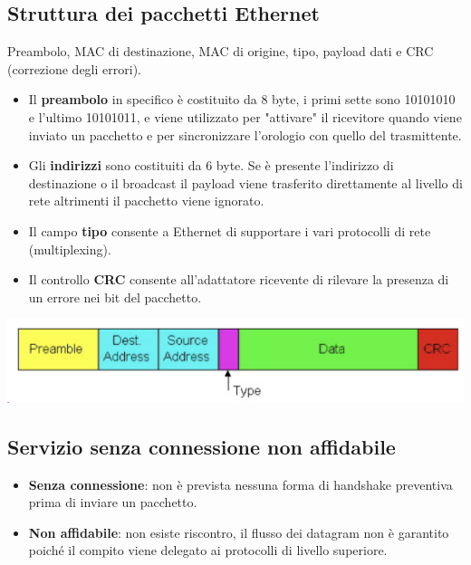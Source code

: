 \documentclass{report}
\begin{document}
\hypertarget{header-n149}{%
\subsection{Struttura dei pacchetti Ethernet}\label{header-n149}}

Preambolo, MAC di destinazione, MAC di origine, tipo, payload dati e CRC
(correzione degli errori).

\begin{itemize}
\item
  Il \textbf{preambolo} in specifico è costituito da 8 byte, i primi
  sette sono 10101010 e l'ultimo 10101011, e viene utilizzato per
  "attivare" il ricevitore quando viene inviato un pacchetto e per
  sincronizzare l'orologio con quello del trasmittente.
\item
  Gli \textbf{indirizzi} sono costituiti da 6 byte. Se è presente
  l'indirizzo di destinazione o il broadcast il payload viene trasferito
  direttamente al livello di rete altrimenti il pacchetto viene
  ignorato.
\item
  Il campo \textbf{tipo} consente a Ethernet di supportare i vari
  protocolli di rete (multiplexing).
\item
  Il controllo \textbf{CRC} consente all'adattatore ricevente di
  rilevare la presenza di un errore nei bit del pacchetto.
\end{itemize}

\begin{center}
		\includegraphics[width=0.7\linewidth]{ethernet}
	\end{center}

\hypertarget{header-n161}{%
\subsection{Servizio senza connessione non
affidabile}\label{header-n161}}

\begin{itemize}
\item
  \textbf{Senza connessione}: non è prevista nessuna forma di handshake
  preventiva prima di inviare un pacchetto.
\item
  \textbf{Non affidabile}: non esiste riscontro, il flusso dei datagram
  non è garantito poiché il compito viene delegato ai protocolli di
  livello superiore.
\end{itemize}
\end{document}

